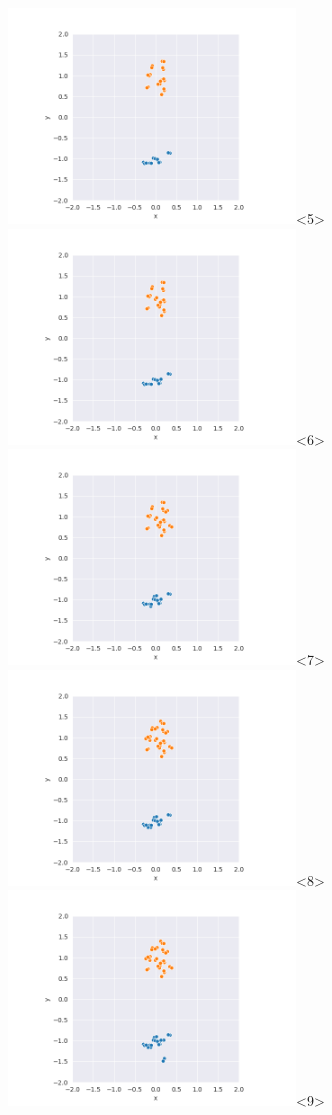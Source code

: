 \begin{frame}
  \includegraphics[width=3in]{../png/single/single_21.png}<5>
  \includegraphics[width=3in]{../png/single/single_26.png}<6>
  \includegraphics[width=3in]{../png/single/single_31.png}<7>
  \includegraphics[width=3in]{../png/single/single_36.png}<8>
  \includegraphics[width=3in]{../png/single/single_41.png}<9>

\end{frame}
